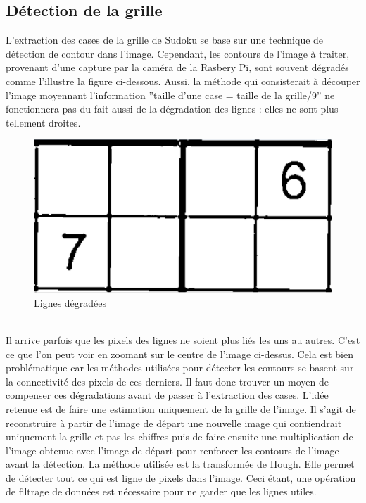 \documentclass[12pt]{article}
\begin{document}
	\subsection{Détection de la grille}
L'extraction des cases de la grille de Sudoku se base sur une technique de détection de contour dans l'image. Cependant, les contours de l'image à traiter, provenant d'une capture par la caméra de la Rasbery Pi, sont souvent dégradés comme l'illustre la figure ci-dessous. Aussi, la méthode qui consisterait à découper l'image moyennant l'information ''taille d'une case = taille de la grille/9'' ne fonctionnera pas du fait aussi de la dégradation des lignes : elles ne sont plus tellement droites.
\begin{figure}[!h]
	\centering
   	\includegraphics[scale = 0.2]{lign_degra.png}
   	\caption{\label{lign_degra} Lignes dégradées}
\end{figure}\\
 Il arrive parfois que les pixels des lignes ne soient plus liés les uns au autres. C'est ce que l'on peut voir en zoomant sur le centre de l'image ci-dessus. Cela est bien problématique car les méthodes utilisées pour détecter les contours se basent sur la connectivité des pixels de ces derniers. Il faut donc trouver un moyen de compenser ces dégradations avant de passer à l'extraction des cases. L'idée retenue est de faire une estimation uniquement de la grille de l'image. Il s'agit de reconstruire à partir de l'image de départ une nouvelle image qui contiendrait uniquement la grille et pas les chiffres puis de faire ensuite une multiplication de l'image obtenue avec l'image de départ pour renforcer les contours de l'image avant la détection. La méthode utilisée est la transformée de Hough. Elle permet de détecter tout ce qui est ligne de pixels dans l'image. Ceci étant, une opération de filtrage de données est nécessaire pour ne garder que les lignes utiles.\\
 
\end{document}
